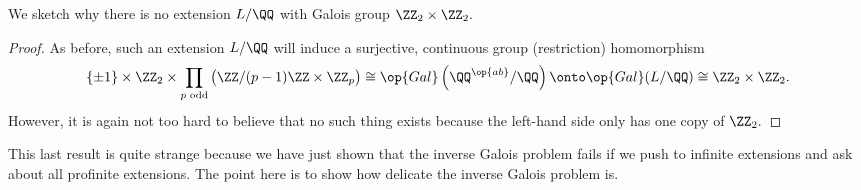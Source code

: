 \begin{exe}
	We sketch why there is no extension $L/\QQ$ with Galois group $\ZZ_2\times\ZZ_2.$
\end{exe}
\begin{proof}
	As before, such an extension $L/\QQ$ will induce a surjective, continuous group (restriction) homomorphism
	\[\{\pm1\}\times\ZZ_2\times\prod_{p\text{ odd}}\big(\ZZ/(p-1)\ZZ\times\ZZ_p\big)\cong\op{Gal}\left(\QQ^{\op{ab}}/\QQ\right)\onto\op{Gal}(L/\QQ)\cong\ZZ_2\times\ZZ_2.\]
	However, it is again not too hard to believe that no such thing exists because the left-hand side only has one copy of $\ZZ_2.$
\end{proof}
This last result is quite strange because we have just shown that the inverse Galois problem fails if we push to infinite extensions and ask about all profinite extensions. The point here is to show how delicate the inverse Galois problem is.
